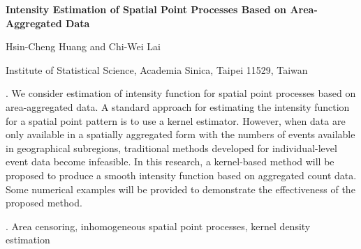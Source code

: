 \documentclass[12pt]{article}
\begin{document}
\begin{flushleft}


{\LARGE\bf Intensity Estimation of Spatial Point Processes Based on Area-Aggregated Data }


\vspace{1.0cm}

Hsin-Cheng Huang and Chi-Wei Lai

\begin{description}

\item Institute of Statistical Science, Academia Sinica, Taipei 11529, Taiwan

\end{description}

\end{flushleft}


\vspace{0.75cm}

. We consider estimation of intensity function for spatial point processes based on area-aggregated data.
A standard approach for estimating the intensity function for a spatial point pattern is to use a kernel estimator.
However, when data are only available in a spatially aggregated form with the numbers of events available in geographical subregions,
traditional methods developed for individual-level event data become infeasible. In this research, a kernel-based method will be proposed to produce a smooth intensity function based on aggregated count data. Some numerical examples will be provided to demonstrate the effectiveness of the proposed method.
\vskip 2mm

.
Area censoring, inhomogeneous spatial point processes, kernel density estimation
\end{document}
